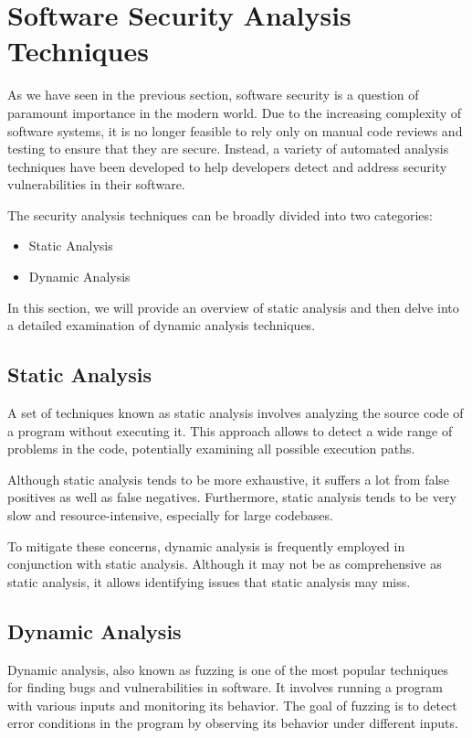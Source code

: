 \section{Software Security Analysis Techniques}

As we have seen in the previous section, software security is a question of paramount importance in the modern world. Due to the increasing complexity of software systems, it is no longer feasible to rely only on manual code reviews and testing to ensure that they are secure. Instead, a variety of automated analysis techniques have been developed to help developers detect and address security vulnerabilities in their software.

The security analysis techniques can be broadly divided into two categories:

\begin{itemize}
    \item Static Analysis
    \item Dynamic Analysis
\end{itemize}

In this section, we will provide an overview of static analysis and then delve into a detailed examination of dynamic analysis techniques.

\subsection{Static Analysis}

A set of techniques known as static analysis involves analyzing the source code of a program without executing it. This approach allows to detect a wide range of problems in the code, potentially examining all possible execution paths.

Although static analysis tends to be more exhaustive, it suffers a lot from false positives as well as false negatives. Furthermore, static analysis tends to be very slow and resource-intensive, especially for large codebases.

To mitigate these concerns, dynamic analysis is frequently employed in conjunction with static analysis. Although it may not be as comprehensive as static analysis, it allows identifying issues that static analysis may miss.

\subsection{Dynamic Analysis}

Dynamic analysis, also known as fuzzing is one of the most popular techniques for finding bugs and vulnerabilities in software. It involves running a program with various inputs and monitoring its behavior. The goal of fuzzing is to detect error conditions in the program by observing its behavior under different inputs.

